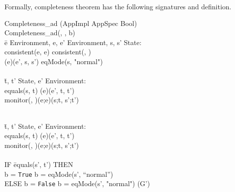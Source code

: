 \documentclass[conference]{IEEEtran}
\begin{document}
Formally, completeness theorem has the following signatures and definition.

\begin{tabbing}
Completeness\_ad  (AppImpl  AppSpec  Bool)
\\Completeness\_ad(, , b) 
\\ \=e  Environment, e, e'  Environment, s, s'  State:
\\\>consistent(e, e)  consistent(, )  
\\\>\textlbrackdbl \textrbrackdbl(e)(e', s, s')  eqMode(s, "normal")
\\
\\\> \=t, t'  State, e'  Environment: 
\\\>\>equals(s, t)  \textlbrackdbl \textrbrackdbl(e)(e', t, t')  
\\\>\>monitor(, )(e;e)(s;t, s';t')

\\\> \=t, t'  State, e'  Environment: 
\\\>\>equals(s, t)  \textlbrackdbl \textrbrackdbl(e)(e', t, t')  
\\\>\>monitor(, )(e;e)(s;t, s';t')
\\\> \=
\\\>\>IF \=equals(s', t')  THEN 
\\\>\>\> b = \texttt{True}  b = eqMode(s', ``normal'')
\\\>\>ELSE b = \texttt{False}  b = eqMode(s', "normal")   \hspace*{0.5cm} (G')
\end{tabbing}
\end{document}
